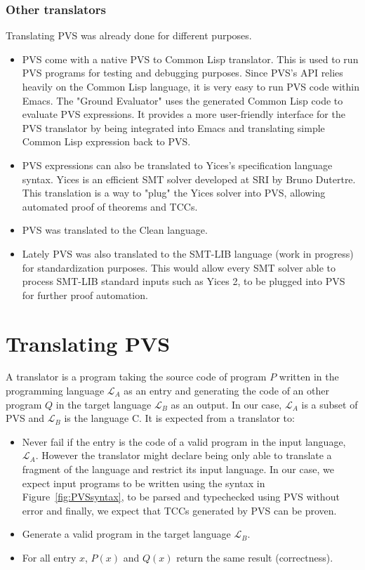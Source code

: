 \documentclass[12pt,a4paper]{article}
\begin{document}
\subsubsection*{Other translators}

Translating PVS was already done for different purposes.
\begin{itemize}
\item PVS come with a native PVS to Common Lisp translator. This is used to run PVS programs for testing and debugging purposes. Since PVS's API relies heavily on the Common Lisp language, it is very easy to run PVS code within Emacs. The "Ground Evaluator" uses the generated Common Lisp code to evaluate PVS expressions. It provides a more user-friendly interface for the PVS translator by being integrated into Emacs and translating simple Common Lisp expression back to PVS.
\item PVS expressions can also be translated to Yices's specification language syntax. Yices is an efficient SMT solver developed at SRI by Bruno Dutertre. This translation is a way to "plug" the Yices solver into PVS, allowing automated proof of theorems and TCCs.
\item PVS was translated to the Clean language.
\item Lately PVS was also translated to the SMT-LIB language (work in progress) for standardization purposes. This would allow every SMT solver able to process SMT-LIB standard inputs such as Yices 2, to be plugged into PVS for further proof automation.
\end{itemize}


\newpage
\section{Translating PVS}

A translator is a program taking the source code of program $P$ written in the programming language $\mathcal{L}_A$ as an entry and generating the code of an other program $Q$ in the target language $\mathcal{L}_B$ as an output. In our case, $\mathcal{L}_A$ is a subset of PVS and $\mathcal{L}_B$ is the language C. It is expected from a translator to:
\begin{itemize}
\item Never fail if the entry is the code of a valid program in the input language, $\mathcal{L}_A$. However the translator might declare being only able to translate a fragment of the language and restrict its input language. In our case, we expect input programs to be written using the syntax in Figure~\ref{fig:PVSsyntax}, to be parsed and typechecked using PVS without error and finally, we expect that TCCs generated by PVS can be proven.
\item Generate a valid program in the target language $\mathcal{L}_B$.
\item For all entry $x$, $P(x)$ and $Q(x)$ return the same result (correctness).
\end{itemize}
\end{document}
